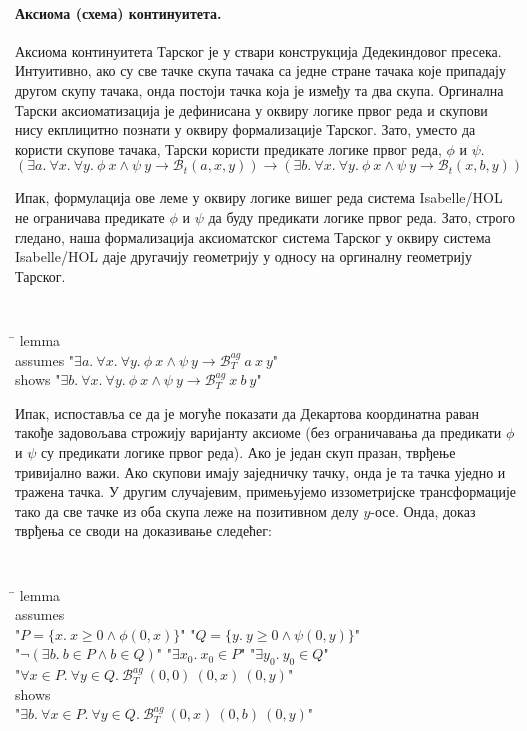 \documentclass[a4paper, 12pt]{article}
\newcommand{\agbett}[3]{\ensuremath{\mathcal{B}_T^{\mathit{ag}}\ #1\ #2\ #3}}
\newcommand{\bett}[3]{\ensuremath{\mathcal{B}_t(#1, #2, #3)}}
\begin{document}
\paragraph{Аксиома (схема) континуитета.}

Аксиома континуитета Тарског је у ствари конструкција Дедекиндовог
пресека. Интуитивно, ако су све тачке скупа тачака са једне стране
тачака које припадају другом скупу тачака, онда постоји тачка која је
између та два скупа. Оргинална Тарски аксиоматизација је дефинисана у
оквиру логике првог реда и скупови нису екплицитно познати у оквиру
формализације Тарског. Зато, уместо да користи скупове тачака, Тарски
користи предикате логике првог реда, $\phi$ и $\psi$.
$$(\exists a.\ \forall x.\ \forall y.\ \phi\ x \wedge \psi\ y \longrightarrow \bett{a}{x}{y}) \longrightarrow (\exists b.\ \forall x.\ \forall y.\ \phi\ x \wedge \psi\ y \longrightarrow \bett{x}{b}{y})$$

Ипак, формулација ове леме у оквиру логике вишег реда система
Isabelle/HOL не ограничава предикате $\phi$ и $\psi$ да буду
предикати логике првог реда. Зато, строго гледано, наша формализација
аксиоматског система Тарског у оквиру система Isabelle/HOL даје
другачију геометрију у односу на оргиналну геометрију Тарског.

{\tt
\begin{tabbing}
\hspace{5mm}\=\kill
lemma\\
\>assumes "$\exists a.\ \forall x.\ \forall y.\ \phi\ x \wedge \psi\ y \longrightarrow \agbett{a}{x}{y}$"\\
\>shows "$\exists b.\ \forall x.\ \forall y.\ \phi\ x \wedge \psi\ y \longrightarrow \agbett{x}{b}{y}$"
\end{tabbing}
}

Ипак, испоставља се да је могуће показати да Декартова координатна
раван такође задовољава строжију варијанту аксиоме (без ограничавања
да предикати $\phi$ и $\psi$ су предикати логике првог реда). Ако је
један скуп празан, тврђење тривијално важи. Ако скупови имају
заједничку тачку, онда је та тачка уједно и тражена тачка. У другим
случајевим, примењујемо иззометријске трансформације тако да све тачке
из оба скупа леже на позитивном делу $y$-осе. Онда, доказ тврђења се
своди на доказивање следећег:

{\tt
\begin{tabbing}
\hspace{5mm}\=\kill
lemma\\
\>assumes\\
\>"$P = \{x.\ x\ge 0 \wedge \phi(0, x)\}$" "$Q = \{y.\ y\ge 0\wedge \psi(0, y)\}$"\\
\>"$\neg (\exists b.\ b \in P \wedge b \in Q)$" "$\exists x_0.\ x_0 \in P$" "$\exists y_0.\ y_0 \in Q$"\\
\>"$\forall x \in P.\ \forall y \in Q.\ \agbett{(0, 0)}{(0, x)}{(0, y)}$"\\
\>shows\\
\>"$\exists b.\ \forall x \in P.\ \forall y \in Q.\ \agbett{(0, x)}{(0, b)}{(0, y)}$"
\end{tabbing}
}
\end{document}
